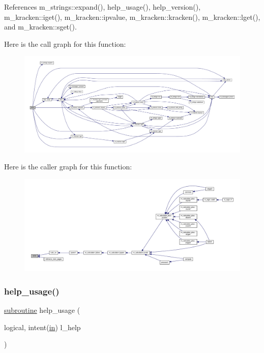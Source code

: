 References m\+\_\+strings\+::expand(), help\+\_\+usage(), help\+\_\+version(), m\+\_\+kracken\+::iget(), m\+\_\+kracken\+::ipvalue, m\+\_\+kracken\+::kracken(), m\+\_\+kracken\+::lget(), and m\+\_\+kracken\+::sget().

Here is the call graph for this function\+:
\nopagebreak
\begin{figure}[H]
\begin{center}
\leavevmode
\includegraphics[width=350pt]{__echo_8f90_a7b58d66872f4cd7b2249cc9d9996f08a_cgraph}
\end{center}
\end{figure}
Here is the caller graph for this function\+:
\nopagebreak
\begin{figure}[H]
\begin{center}
\leavevmode
\includegraphics[width=350pt]{__echo_8f90_a7b58d66872f4cd7b2249cc9d9996f08a_icgraph}
\end{center}
\end{figure}
\mbox{\label{__echo_8f90_a3e09a3b52ee8fb04eeb93fe5761626a8}} 
\subsubsection{\texorpdfstring{help\+\_\+usage()}{help\_usage()}}
{\footnotesize\ttfamily \hyperlink{M__stopwatch_83_8txt_acfbcff50169d691ff02d4a123ed70482}{subroutine} help\+\_\+usage (\begin{DoxyParamCaption}\item[{logical, intent(\hyperlink{M__journal_83_8txt_afce72651d1eed785a2132bee863b2f38}{in})}]{l\+\_\+help }\end{DoxyParamCaption})}



